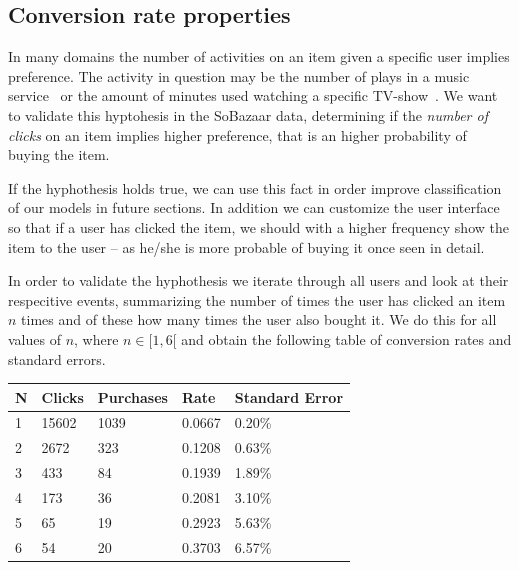 

\clearpage
\subsection{Conversion rate properties}

In many domains the number of activities on an item given a specific user
implies preference. The activity in question may be the number of plays in a
music service~\cite{parra2011walk} or the amount of minutes used watching a
specific TV-show~\cite{study-on-implicit-tv}. We want to validate this
hyptohesis in the SoBazaar data, determining if the \textit{number of clicks}
on an item implies higher preference, that is an higher probability of buying
the item.



If the hyphothesis holds true, we can use this fact in order improve
classification of our models in future sections. In addition we can customize
the user interface so that if a user has clicked the item, we should with a
higher frequency show the item to the user – as he/she is more probable of
buying it once seen in detail.

In order to validate the hyphothesis we iterate through all users and look at
their respecitive events, summarizing the number of times the user has clicked
an item $n$ times and of these how many times the user also bought it. We do
this for all values of $n$, where $n \in [1,6[$ and obtain the following table
of conversion rates and standard errors.

\begin{table}[H]
  \centering
  \begin{tabular}{lllll}
    \toprule
    N & Clicks & Purchases & Rate & Standard Error \\
    \midrule
    1 & 15602 & 1039  & 0.0667 & 0.20\% \\
    2 & 2672  & 323   & 0.1208 & 0.63\% \\
    3 & 433   & 84    & 0.1939 & 1.89\% \\
    4 & 173   & 36    & 0.2081 & 3.10\% \\
    5 & 65    & 19    & 0.2923 & 5.63\% \\
    6 & 54    & 20    & 0.3703 & 6.57\% \\
    \bottomrule
  \end{tabular}
\end{table}

